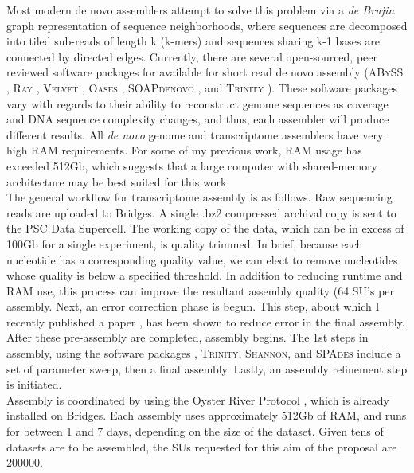 \documentclass[10.5pt]{article}
\begin{document}
{\noindent
Most modern de novo assemblers attempt to solve this problem via a \textit{de Brujin} graph representation of sequence neighborhoods, where sequences are decomposed into tiled sub-reads of length k (k-mers) and sequences sharing k-1 bases are connected by directed edges.  Currently, there are several open-sourced, peer reviewed software packages for available for short read de novo assembly (\textsc{ABySS} \citep{Birol:2009ia,Simpson:2009iv}, \textsc{Ray} \citep{Boisvert:2010dz}, \textsc{Velvet} \citep{Zerbino:2008bm}, \textsc{Oases} \citep{Schulz:2012je}, \textsc{SOAPdenovo} \citep{Li:2009cx},  and \textsc{Trinity} \citep{Haas:jq,Grabherr:2011jb}).  These software packages vary with regards to their ability to reconstruct genome sequences as coverage and DNA sequence complexity changes, and thus, each assembler will produce different results.  All \textit{de novo} genome and transcriptome assemblers have very high RAM requirements. For some of my previous work, RAM usage has exceeded 512Gb, which suggests that a large computer with shared-memory architecture may be best suited for this work.   \\

\noindent
The general workflow for transcriptome assembly is as follows. Raw sequencing reads are uploaded to Bridges.  A single .bz2 compressed archival copy is sent to the PSC Data Supercell. The working copy of the data, which can be in excess of 100Gb for a single experiment, is quality trimmed. In brief, because each nucleotide has a corresponding quality value, we can elect to remove nucleotides whose quality is below a specified threshold. In addition to reducing runtime and RAM use, this process can improve the resultant assembly quality (64 SU's per assembly. Next, an error correction phase is begun.  This step, about which I recently published a paper \citep{MacManes:2013ec}, has been shown to reduce error in the final assembly.  \\

\noindent
After these pre-assembly are completed, assembly begins. The 1st steps in assembly, using the software packages , \textsc{Trinity}, \textsc{Shannon}, and \textsc{SPAdes} include a set of parameter sweep, then a final assembly. Lastly, an assembly refinement step is initiated.   \\

\noindent
Assembly is coordinated by using the Oyster River Protocol \cite{MacManes:2015iz}, which is already installed on Bridges. Each assembly uses approximately 512Gb of RAM, and runs for between 1 and 7 days, depending on the size of the dataset. Given tens of datasets are to be assembled, the SUs requested for this aim of the proposal are 200000.  

}
\end{document}
